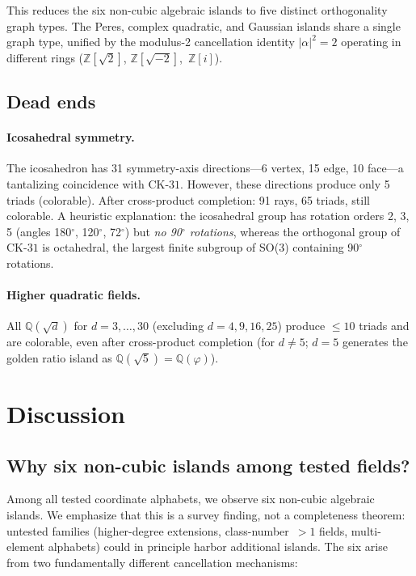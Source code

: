 \documentclass[12pt,a4paper]{article}
\newcommand{\Z}{\mathbb{Z}}
\newcommand{\Q}{\mathbb{Q}}
\newcommand{\CK}{\mathrm{CK}\text{-}31}
\begin{document}
This reduces the six non-cubic algebraic islands to five distinct orthogonality graph types. The Peres, complex quadratic, and Gaussian islands share a single graph type, unified by the modulus-2 cancellation identity $|\alpha|^2 = 2$ operating in different rings ($\Z[\sqrt{2}]$, $\Z[\sqrt{-2}]$,~$\Z[i]$).

\subsection{Dead ends}

\paragraph{Icosahedral symmetry.} The icosahedron has 31 symmetry-axis directions---6 vertex, 15 edge, 10 face---a tantalizing coincidence with $\CK$. However, these directions produce only 5 triads (colorable). After cross-product completion: 91 rays, 65 triads, still colorable. A heuristic explanation: the icosahedral group has rotation orders 2, 3, 5 (angles 180$^\circ$, 120$^\circ$, 72$^\circ$) but \emph{no 90$^\circ$ rotations}, whereas the orthogonal group of $\CK$ is octahedral, the largest finite subgroup of SO(3) containing 90$^\circ$ rotations.

\paragraph{Higher quadratic fields.} All $\Q(\sqrt{d})$ for $d = 3, \ldots, 30$ (excluding $d = 4, 9, 16, 25$) produce $\leq 10$ triads and are colorable, even after cross-product completion (for $d \neq 5$; $d = 5$ generates the golden ratio island as $\Q(\sqrt{5}) = \Q(\varphi)$).

\section{Discussion}\label{sec:discussion}

\subsection{Why six non-cubic islands among tested fields?}

Among all tested coordinate alphabets, we observe six non-cubic algebraic islands.  We emphasize that this is a survey finding, not a completeness theorem: untested families (higher-degree extensions, class-number~$> 1$ fields, multi-element alphabets) could in principle harbor additional islands.  The six arise from two fundamentally different cancellation mechanisms:
\end{document}
